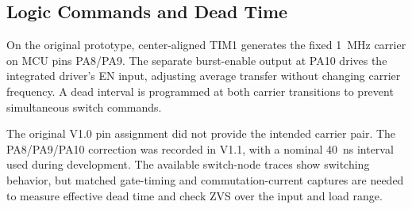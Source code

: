 \subsection{Logic Commands and Dead Time}
\label{sec:hw-gatedrive}

On the original prototype, center-aligned TIM1 generates the fixed \SI{1}{\mega\hertz} carrier on MCU pins PA8/PA9. The separate burst-enable output at PA10 drives the integrated driver's EN input, adjusting average transfer without changing carrier frequency. A dead interval is programmed at both carrier transitions to prevent simultaneous switch commands.

The original V1.0 pin assignment did not provide the intended carrier pair. The PA8/PA9/PA10 correction was recorded in V1.1, with a nominal \SI{40}{\nano\second} interval used during development. The available switch-node traces show switching behavior, but matched gate-timing and commutation-current captures are needed to measure effective dead time and check ZVS over the input and load range.
